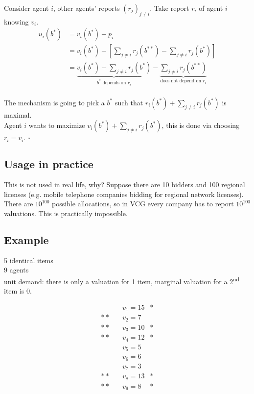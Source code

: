 \documentclass{article}
\begin{document}
\noindent
Consider agent $i$, other agents' reports $(r_j)_{j\neq i}$. Take report $r_i$ of agent $i$ knowing $v_i$.
\begin{equation*}
    \begin{aligned}
    u_i(b^*)&=v_i(b^*)-p_i\\
    &=v_i(b^*)-\left[\sum_{j\neq i}r_j(b^{**})-\sum_{j\neq i}r_j(b^*)\right]\\
    &=\underbrace{v_i(b^*)+\sum_{j\neq i}r_j(b^*)}_{b^* \text{ depends on }r_i}-\underbrace{\sum_{j\neq i}r_j(b^{**})}_{\text{does not depend on }r_i}
    \end{aligned}
\end{equation*}\\

\noindent
The mechanism is going to pick a $b^*$ such that $r_i(b^*)+\sum_{j\neq i}r_j(b^*)$ is maximal.\\

\noindent
Agent $i$ wants to maximize $v_i(b^*)+\sum_{j\neq i}r_j(b^*)$, this is done via choosing $r_i=v_i$. \ensuremath{\square}

\subsection*{Usage in practice}
This is not used in real life, why? Suppose there are 10 bidders and 100 regional licenses (e.g. mobile telephone companies bidding for regional network licenses).\\

\noindent
There are $10^{100}$ possible allocations, so in VCG every company has to report $10^{100}$ valuations. This is practically impossible.

\subsection*{Example}
5 identical items\\
9 agents\\
unit demand: there is only a valuation for 1 item, marginal valuation for a 2\textsuperscript{nd} item is 0.

\begin{equation*}
    \begin{aligned}
     &v_1=15&*\\
    **\quad &v_2=7&\\
    **\quad &v_3=10&*\\
    **\quad &v_4=12&*\\
    &v_5=5&\\
    &v_6=6&\\
    &v_7=3&\\
    **\quad&v_8=13&*\\
    **\quad&v_9=8&*
    \end{aligned}
\end{equation*}\\
\end{document}
